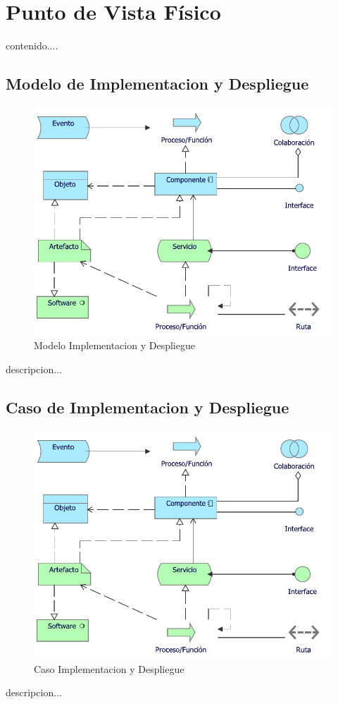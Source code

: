 \section{Punto de Vista Físico}
contenido....
\subsection{Modelo de Implementacion y Despliegue}
\begin{figure}[h!]
	\centering
	\includegraphics[width=.5\linewidth]{imgs/modelo/Implementacion}
	\caption{Modelo Implementacion y Despliegue}
\end{figure}
descripcion...

\newpage

\subsection{Caso  de Implementacion y Despliegue}
\begin{figure}[h!]
	\centering
	\includegraphics[width=.5\linewidth]{imgs/caso/Implementacion}
	\caption{Caso Implementacion y Despliegue}
\end{figure}
descripcion...